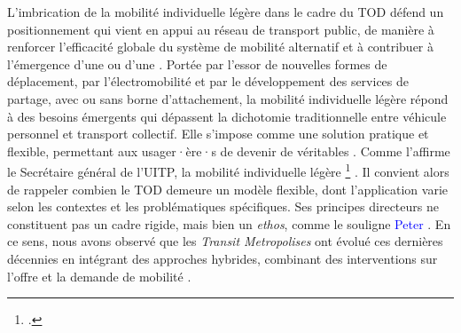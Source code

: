 \begin{refsegment}
L’imbrication de la mobilité individuelle légère dans le cadre du \acrshort{TOD} défend un positionnement qui vient en appui au réseau de transport public, de manière à renforcer l’efficacité globale du système de mobilité alternatif et à contribuer à l’émergence d'une  ou d'une  \textcolor{blue}{\autocite[2]{schultz_micromobility_2019}}. Portée par l’essor de nouvelles formes de déplacement, par l’électromobilité et par le développement des services de partage, avec ou sans borne d'attachement, la mobilité individuelle légère répond à des besoins émergents qui dépassent la dichotomie traditionnelle entre véhicule personnel et transport collectif. Elle s’impose comme une solution pratique et flexible, permettant aux usager·ère·s de devenir de véritables  \textcolor{blue}{\autocite[1]{boffi_extrait_2019}}. Comme l’affirme le Secrétaire général de l’\acrfull{UITP}, la mobilité individuelle légère \footnote{
     \textcolor{blue}{\autocite{bcg_role_2020}}.
} \textcolor{blue}{\autocite{bcg_role_2020}}. Il convient alors de rappeler combien le \acrshort{TOD} demeure un modèle flexible, dont l’application varie selon les contextes et les problématiques spécifiques. Ses principes directeurs ne constituent pas un cadre rigide, mais bien un \textsl{ethos}, comme le souligne \textcolor{blue}{Peter} \textcolor{blue}{\textcite[11]{calthorpe_next_1993}}. En ce sens, nous avons observé que les \textsl{Transit Metropolises} ont évolué ces dernières décennies en intégrant des approches hybrides, combinant des interventions sur l’offre et la demande de mobilité \textcolor{blue}{\textcite[137-143]{cervero_transit_2020}}.%


\end{refsegment}
